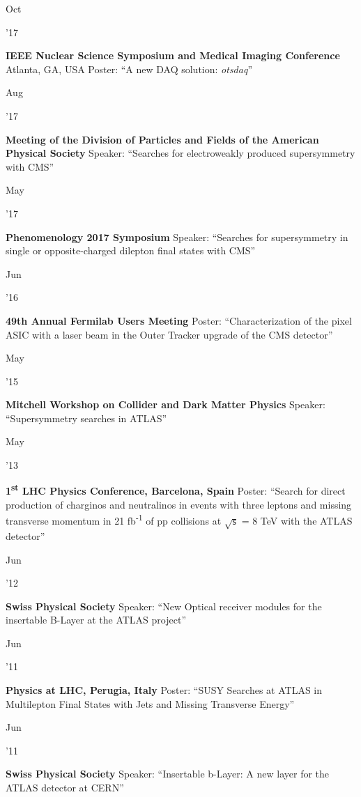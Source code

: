 \documentclass[]{cv} %
\begin{document}
\begin{entrylist}

  \entrytwo
  {\parbox[t]{\parboxWidthOne}{Oct}\parbox[t]{\parboxWidthTwo}{\hfill '17}}
  {\textbf{IEEE Nuclear Science Symposium and Medical Imaging Conference}}
  {Atlanta, GA, USA}
  {Poster: ``A new DAQ solution: \textit{otsdaq}''}

  \entry
  {\parbox[t]{\parboxWidthOne}{Aug}\parbox[t]{\parboxWidthTwo}{\hfill '17}}
  {\textbf{Meeting of the Division of Particles and Fields of the American Physical Society}}
  {}
  {Speaker: ``Searches for electroweakly produced supersymmetry with CMS''}

  \entry
  {\parbox[t]{\parboxWidthOne}{May}\parbox[t]{\parboxWidthTwo}{\hfill '17}}
  {\textbf{Phenomenology 2017 Symposium}}
  {}
  {Speaker: ``Searches for supersymmetry in single or opposite-charged dilepton final states with CMS''}

  \entry
  {\parbox[t]{\parboxWidthOne}{Jun}\parbox[t]{\parboxWidthTwo}{\hfill '16}}
  {\textbf{49th Annual Fermilab Users Meeting}}
  {}
  {Poster: ``Characterization of the pixel ASIC with a laser beam in the Outer Tracker upgrade of the CMS detector''}

  \entry
  {\parbox[t]{\parboxWidthOne}{May}\parbox[t]{\parboxWidthTwo}{\hfill '15}}
  {\textbf{Mitchell Workshop on Collider and Dark Matter Physics}}
  {}
  {Speaker: ``Supersymmetry searches in ATLAS''}

  \entry
  {\parbox[t]{\parboxWidthOne}{May}\parbox[t]{\parboxWidthTwo}{\hfill '13}}
  {\textbf{1\textsuperscript{st} LHC Physics Conference, Barcelona, Spain}}
  {}
  {Poster: ``Search for direct production of charginos and neutralinos in events with three
    leptons and missing transverse momentum in 21 fb\textsuperscript{-1} of pp collisions at $\sqrt{\mathsf{s}}$ = 8 TeV with the ATLAS
  detector''}

  \entry
  {\parbox[t]{\parboxWidthOne}{Jun}\parbox[t]{\parboxWidthTwo}{\hfill '12}}
  {\textbf{Swiss Physical Society}}
  {}
  {Speaker: ``New Optical receiver modules for the insertable B-Layer at the ATLAS project''}

  \entry
  {\parbox[t]{\parboxWidthOne}{Jun}\parbox[t]{\parboxWidthTwo}{\hfill '11}}
  {\textbf{Physics at LHC, Perugia, Italy}}
  {}
  {Poster: ``SUSY Searches at ATLAS in Multilepton Final States with Jets and Missing Transverse Energy''}

  \entry
  {\parbox[t]{\parboxWidthOne}{Jun}\parbox[t]{\parboxWidthTwo}{\hfill '11}}
  {\textbf{Swiss Physical Society}}
  {}
  {Speaker: ``Insertable b-Layer: A new layer for the ATLAS detector at CERN''}

\end{entrylist}
\end{document}
